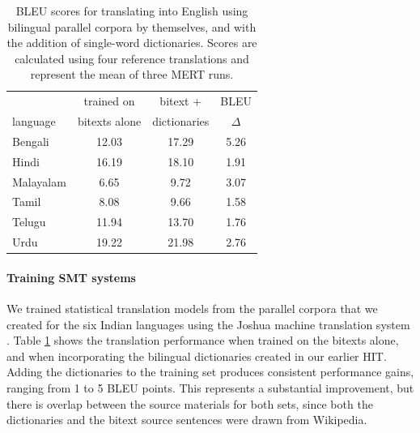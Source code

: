 \documentclass[11pt]{article}
\begin{document}
\begin{table}[t]
\centering
  \small
\begin{tabular}{l|cc|c}
  		  & trained on  &  bitext + & BLEU \\
  language  & bitexts alone &  dictionaries & $\Delta$ \\
  \hline\hline
  Bengali    &  12.03 & 17.29 & 5.26 \\
  Hindi      & 16.19 & 18.10 & 1.91 \\  
  Malayalam    &  6.65 & 9.72 & 3.07 \\      
  Tamil      & 8.08 & 9.66 & 1.58 \\  
  Telugu     & 11.94 & 13.70 & 1.76 \\  
  Urdu        & 19.22 & 21.98 & 2.76 \\   
\end{tabular}
\caption{BLEU scores for translating into English using bilingual parallel corpora by themselves, and with the addition of single-word dictionaries. Scores are calculated using four reference translations and represent the mean of three MERT runs.}
\label{dictionary_bleu}
\end{table}





\paragraph{Training SMT systems}
We trained statistical translation models from the parallel corpora that we created for the six Indian languages using the Joshua machine translation system \cite{post-EtAl:2013:WMT}. Table \ref{dictionary_bleu} shows the translation performance when trained on the bitexts alone, and when incorporating the bilingual dictionaries created in our earlier HIT. Adding the dictionaries to the training set produces consistent performance gains, ranging from 1 to 5 BLEU points.  This represents a substantial improvement, but there is overlap between the source materials for both sets, since both the dictionaries and the bitext source sentences were drawn from Wikipedia.

\end{document}
